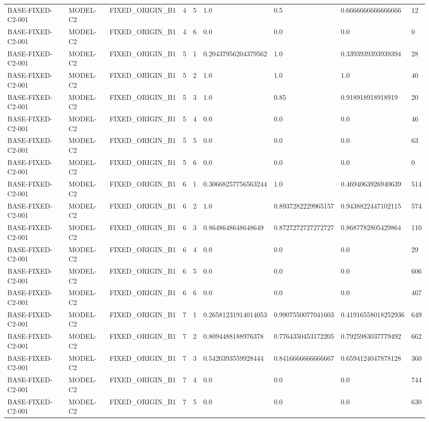 \begin{tabular}{lllllllll}
BASE-FIXED-C2-001 & MODEL-C2 & FIXED\_ORIGIN\_B1 & 4 & 5 & 1.0 & 0.5 & 0.6666666666666666 & 12 \\
BASE-FIXED-C2-001 & MODEL-C2 & FIXED\_ORIGIN\_B1 & 4 & 6 & 0.0 & 0.0 & 0.0 & 0 \\
BASE-FIXED-C2-001 & MODEL-C2 & FIXED\_ORIGIN\_B1 & 5 & 1 & 0.20437956204379562 & 1.0 & 0.3393939393939394 & 28 \\
BASE-FIXED-C2-001 & MODEL-C2 & FIXED\_ORIGIN\_B1 & 5 & 2 & 1.0 & 1.0 & 1.0 & 40 \\
BASE-FIXED-C2-001 & MODEL-C2 & FIXED\_ORIGIN\_B1 & 5 & 3 & 1.0 & 0.85 & 0.918918918918919 & 20 \\
BASE-FIXED-C2-001 & MODEL-C2 & FIXED\_ORIGIN\_B1 & 5 & 4 & 0.0 & 0.0 & 0.0 & 46 \\
BASE-FIXED-C2-001 & MODEL-C2 & FIXED\_ORIGIN\_B1 & 5 & 5 & 0.0 & 0.0 & 0.0 & 63 \\
BASE-FIXED-C2-001 & MODEL-C2 & FIXED\_ORIGIN\_B1 & 5 & 6 & 0.0 & 0.0 & 0.0 & 0 \\
BASE-FIXED-C2-001 & MODEL-C2 & FIXED\_ORIGIN\_B1 & 6 & 1 & 0.30668257756563244 & 1.0 & 0.4694063926940639 & 514 \\
BASE-FIXED-C2-001 & MODEL-C2 & FIXED\_ORIGIN\_B1 & 6 & 2 & 1.0 & 0.8937282229965157 & 0.9438822447102115 & 574 \\
BASE-FIXED-C2-001 & MODEL-C2 & FIXED\_ORIGIN\_B1 & 6 & 3 & 0.8648648648648649 & 0.8727272727272727 & 0.8687782805429864 & 110 \\
BASE-FIXED-C2-001 & MODEL-C2 & FIXED\_ORIGIN\_B1 & 6 & 4 & 0.0 & 0.0 & 0.0 & 29 \\
BASE-FIXED-C2-001 & MODEL-C2 & FIXED\_ORIGIN\_B1 & 6 & 5 & 0.0 & 0.0 & 0.0 & 606 \\
BASE-FIXED-C2-001 & MODEL-C2 & FIXED\_ORIGIN\_B1 & 6 & 6 & 0.0 & 0.0 & 0.0 & 467 \\
BASE-FIXED-C2-001 & MODEL-C2 & FIXED\_ORIGIN\_B1 & 7 & 1 & 0.26581231914014053 & 0.9907550077041603 & 0.41916558018252936 & 649 \\
BASE-FIXED-C2-001 & MODEL-C2 & FIXED\_ORIGIN\_B1 & 7 & 2 & 0.8094488188976378 & 0.7764350453172205 & 0.7925983037779492 & 662 \\
BASE-FIXED-C2-001 & MODEL-C2 & FIXED\_ORIGIN\_B1 & 7 & 3 & 0.5420393559928444 & 0.8416666666666667 & 0.6594124047878128 & 360 \\
BASE-FIXED-C2-001 & MODEL-C2 & FIXED\_ORIGIN\_B1 & 7 & 4 & 0.0 & 0.0 & 0.0 & 744 \\
BASE-FIXED-C2-001 & MODEL-C2 & FIXED\_ORIGIN\_B1 & 7 & 5 & 0.0 & 0.0 & 0.0 & 630 \\

\end{tabular}
